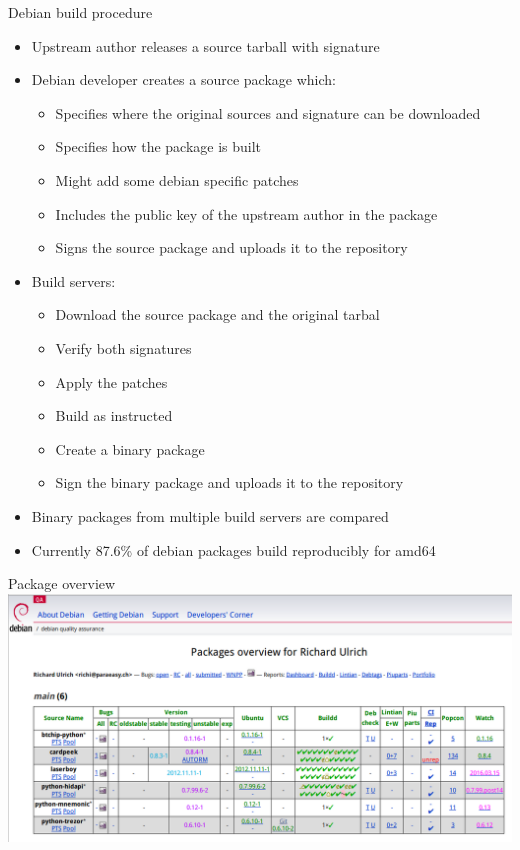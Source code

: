 \documentclass[11pt]{beamer}
\begin{document}
\begin{frame}{Debian build procedure}
\begin{itemize}
\item Upstream author releases a source tarball with signature
\pause
\item Debian developer creates a source package which:
\begin{itemize}
\item Specifies where the original sources and signature can be downloaded
\item Specifies how the package is built
\item Might add some debian specific patches
\item Includes the public key of the upstream author in the package
\item Signs the source package and uploads it to the repository
\end{itemize}
\pause
\item Build servers:
\begin{itemize}
\item Download the source package and the original tarbal
\item Verify both signatures
\item Apply the patches
\item Build as instructed
\item Create a binary package
\item Sign the binary package and uploads it to the repository
\end{itemize}
\pause
\item Binary packages from multiple build servers are compared
\item Currently 87.6\% of debian packages build reproducibly for amd64
\end{itemize}
\end{frame}

\begin{frame}{Package overview}
\includegraphics[scale=0.33]{debian_qa.png}
\end{frame}
\end{document}
